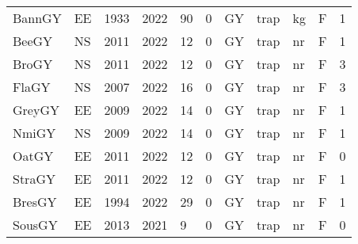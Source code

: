\begin{table}[htbp]
\begin{tabular}{p{1cm}p{1cm}p{1cm}p{1cm}p{0.8cm}p{0.8cm}p{1cm}p{2cm}p{2cm}p{1cm}p{1cm}}
  BannGY & EE & 1933 & 2022 & 90 & 0 & GY & trap & kg & F & 1 \\ 
  BeeGY & NS & 2011 & 2022 & 12 & 0 & GY & trap & nr & F & 1 \\ 
  BroGY & NS & 2011 & 2022 & 12 & 0 & GY & trap & nr & F & 3 \\ 
  FlaGY & NS & 2007 & 2022 & 16 & 0 & GY & trap & nr & F & 3 \\ 
  GreyGY & EE & 2009 & 2022 & 14 & 0 & GY & trap & nr & F & 1 \\ 
  NmiGY & NS & 2009 & 2022 & 14 & 0 & GY & trap & nr & F & 1 \\ 
  OatGY & EE & 2011 & 2022 & 12 & 0 & GY & trap & nr & F & 0 \\ 
  StraGY & EE & 2011 & 2022 & 12 & 0 & GY & trap & nr & F & 1 \\ 
  BresGY & EE & 1994 & 2022 & 29 & 0 & GY & trap & nr & F & 1 \\ 
  SousGY & EE & 2013 & 2021 & 9 & 0 & GY & trap & nr & F & 0 \\ 
   \hline
\end{tabular}
\end{table}
